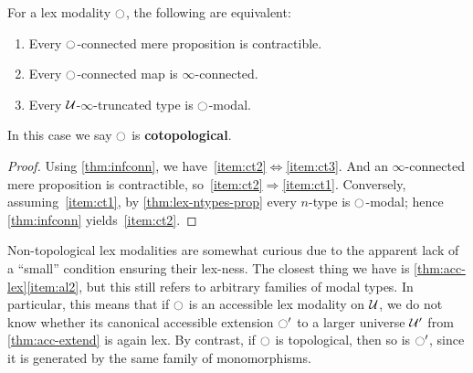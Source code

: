 \begin{thm}\label{thm:cotop}
  For a lex modality ${\ocircle}$, the following are equivalent:
  \begin{enumerate}
  \item Every ${\ocircle}$-connected mere proposition is contractible.\label{item:ct1}
  \item Every ${\ocircle}$-connected map is $\infty$-connected.\label{item:ct2}
  \item Every $\mathcal{U}$-$\infty$-truncated type is ${\ocircle}$-modal.\label{item:ct3}
  \end{enumerate}
  In this case we say ${\ocircle}$ is \textbf{cotopological}.
\end{thm}
\begin{proof}
  Using \cref{thm:infconn}, we have~\ref{item:ct2}$\Leftrightarrow$\ref{item:ct3}.
  And an $\infty$-connected mere proposition is contractible, so~\ref{item:ct2}$\Rightarrow$\ref{item:ct1}.
  Conversely, assuming~\ref{item:ct1}, by \cref{thm:lex-ntypes-prop} every $n$-type is ${\ocircle}$-modal; hence \cref{thm:infconn} yields~\ref{item:ct2}.
\end{proof}

\begin{rmk}\label{thm:nontop-lex}
  Non-topological lex modalities are somewhat curious due to the apparent lack of a ``small'' condition ensuring their lex-ness.
  The closest thing we have is \cref{thm:acc-lex}\ref{item:al2}, but this still refers to arbitrary families of modal types.
  In particular, this means that if ${\ocircle}$ is an accessible lex modality on $\mathcal{U}$, we do not know whether its canonical accessible extension ${\ocircle}'$ to a larger universe $\mathcal{U}'$ from \cref{thm:acc-extend} is again lex.
  By contrast, if ${\ocircle}$ is topological, then so is ${\ocircle}'$, since it is generated by the same family of monomorphisms.
\end{rmk}

